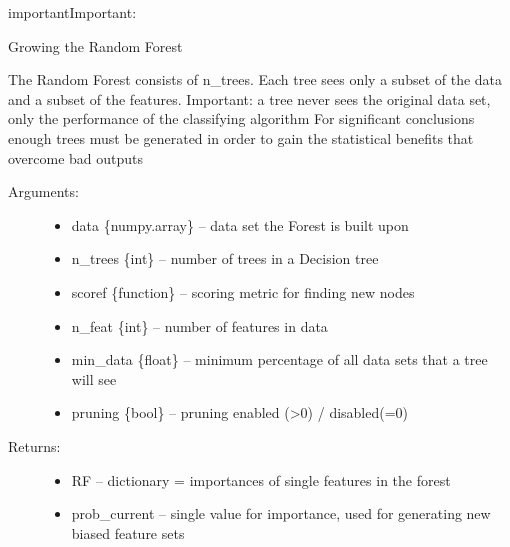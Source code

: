 \documentclass[letterpaper,10pt,english]{sphinxmanual}
\begin{document}
\begin{sphinxadmonition}{important}{Important:}
\label{\detokenize{RF:buildforest}}

\begin{fulllineitems}
\label{\detokenize{RF:ForestFire.Main.buildforest}}
Growing the Random Forest

The Random Forest consists of n\_trees. Each tree sees only a subset of the data and a subset of the features.
Important: a tree never sees the original data set, only the performance of the classifying algorithm
For significant conclusions enough trees must be generated in order to gain the statistical benefits that overcome bad outputs
\begin{description}
\item[{Arguments:}] \leavevmode\begin{itemize}
\item {} 
data \{numpy.array\} -- data set the Forest is built upon

\item {} 
n\_trees \{int\} -- number of trees in a Decision tree

\item {} 
scoref \{function\} -- scoring metric for finding new nodes

\item {} 
n\_feat \{int\} -- number of features in data

\item {} 
min\_data \{float\} -- minimum percentage of all data sets that a tree will see

\item {} 
pruning \{bool\} -- pruning enabled (\textgreater{}0) / disabled(=0)

\end{itemize}

\item[{Returns:}] \leavevmode\begin{itemize}
\item {} 
RF --  dictionary = importances of single features in the forest

\item {} 
prob\_current -- single value for importance, used for generating new biased feature sets


\end{itemize}
\end{description}
\end{fulllineitems}
\end{sphinxadmonition}
\end{document}
